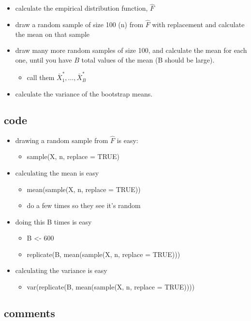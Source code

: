 \documentclass[11pt]{article}
\begin{document}
\begin{itemize}
\item calculate the empirical distribution function, $\hat F$
\item draw a random sample of size 100 (n) from $\hat F$ with
         replacement and calculate the mean on that sample
\item draw many more random samples of size 100, and calculate the
         mean for each one, until you have $B$ total values of the mean
         (B should be large).
\begin{itemize}
\item call them $\bar X_1^*,\dots, \bar X_B^*$
\end{itemize}
\item calculate the variance of the bootstrap means.
\end{itemize}
\subsection{code}
\label{sec-1-2}

\begin{itemize}
\item drawing a random sample from $\hat F$ is easy:
\begin{itemize}
\item sample(X, n, replace = TRUE)
\end{itemize}
\item calculating the mean is easy
\begin{itemize}
\item mean(sample(X, n, replace = TRUE))
\item do a few times so they see it's random
\end{itemize}
\item doing this B times is easy
\begin{itemize}
\item B <- 600
\item replicate(B, mean(sample(X, n, replace = TRUE)))
\end{itemize}
\item calculating the variance is easy
\begin{itemize}
\item var(replicate(B, mean(sample(X, n, replace = TRUE))))
\end{itemize}
\end{itemize}
\subsection{comments}
\label{sec-1-3}
\end{document}
